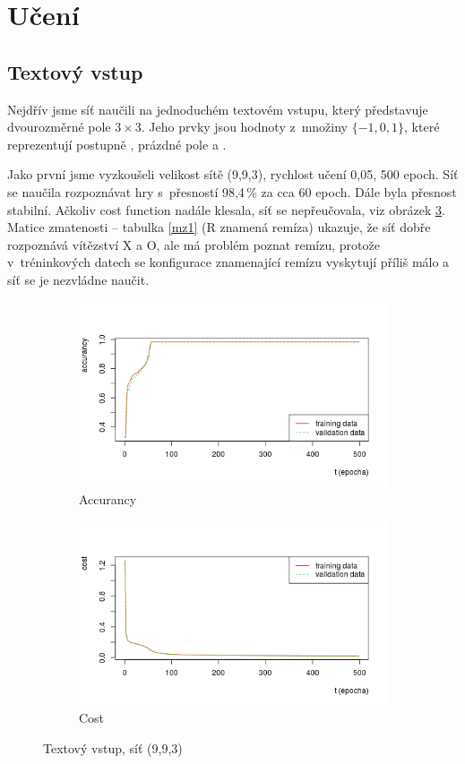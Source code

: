 \documentclass[10pt,a4paper]{article}
\begin{document}
\section*{Učení}
\subsection*{Textový vstup}
Nejdřív jsme síť naučili na jednoduchém textovém vstupu, který představuje dvourozměrné pole $3\times 3$. Jeho prvky jsou hodnoty z~množiny $\{-1,0,1\}$, které reprezentují  postupně , prázdné pole a .

Jako první jsme vyzkoušeli velikost sítě (9,9,3), rychlost učení 0,05, 500 epoch. Síť se naučila rozpoznávat hry s~přesností 98,4\,\% za cca 60 epoch. Dále byla přesnost stabilní. Ačkoliv cost function nadále klesala, síť se nepřeučovala, viz obrázek \ref{fig:1}. Matice zmatenosti -- tabulka \ref{mz1} (R znamená remíza) ukazuje, že síť dobře rozpoznává vítězství X a O, ale má problém poznat remízu, protože v~tréninkových datech se konfigurace znamenající remízu vyskytují příliš málo a síť se je nezvládne naučit. 

\begin{figure}[h!]
\centering
\begin{subfigure}{.5\textwidth}
  \centering
  \includegraphics[width=\textwidth]{a1}
  \caption{Accurancy}
  \label{fig:a1}
\end{subfigure}%
\begin{subfigure}{.5\textwidth}
  \centering
  \includegraphics[width=\textwidth]{c1}
  \caption{Cost}
  \label{fig:c1}
\end{subfigure}
\caption{Textový vstup, síť (9,9,3)}
\label{fig:1}
\end{figure}
\end{document}
